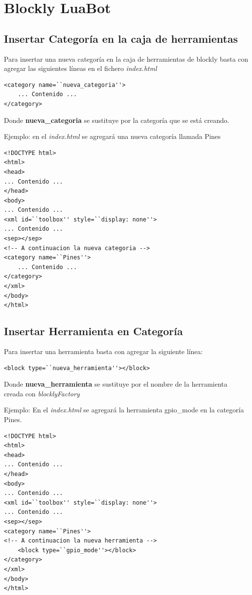 \section{Blockly LuaBot}

\subsection{Insertar Categoría en la caja de herramientas} 

Para insertar una nueva categoría en la caja de herramientas de blockly 
basta con agregar las siguientes líneas en el fichero \textit{index.html}

\begin{verbatim}
<category name=``nueva_categoria''>
	... Contenido ...
</category>
\end{verbatim}

Donde \textbf{nueva\_categoria} se sustituye por la categoría que se está
creando.

Ejemplo: en el \textit{index.html} se agregará una nueva categoría llamada
Pines

\begin{verbatim}
<!DOCTYPE html>
<html>
<head>
... Contenido ...
</head>
<body>
... Contenido ...
<xml id=``toolbox'' style=``display: none''>
... Contenido ...
<sep></sep>
<!-- A continuacion la nueva categoria -->
<category name=``Pines''>
	... Contenido ...
</category>
</xml>
</body>
</html>
\end{verbatim}


\subsection{Insertar Herramienta en Categoría}

Para insertar una herramienta basta con agregar la siguiente línea:

\begin{verbatim}
<block type=``nueva_herramienta''></block>
\end{verbatim}

Donde \textbf{nueva\_herramienta} se sustituye por el nombre de la 
herramienta creada con \textit{blocklyFactory}

Ejemplo: En el \textit{index.html} se agregará la herramienta gpio\_mode 
en la categoría Pines.

\begin{verbatim}
<!DOCTYPE html>
<html>
<head>
... Contenido ...
</head>
<body>
... Contenido ...
<xml id=``toolbox'' style=``display: none''>
... Contenido ...
<sep></sep>
<category name=``Pines''>
<!-- A continuacion la nueva herramienta -->
	<block type=``gpio_mode''></block>
</category>
</xml>
</body>
</html>
\end{verbatim}

